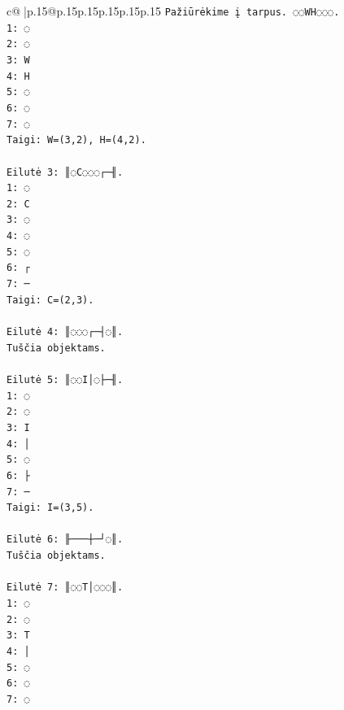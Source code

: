 \documentclass{article}
\begin{document}
{\begin{supertabular}{c@{$\;$}|p{.15\linewidth}@{}p{.15\linewidth}p{.15\linewidth}p{.15\linewidth}p{.15\linewidth}p{.15\linewidth}}
{{{\texttt{Pažiūrėkime į tarpus. ◌◌WH◌◌◌.} \\
\texttt{1: ◌} \\
\texttt{2: ◌} \\
\texttt{3: W} \\
\texttt{4: H} \\
\texttt{5: ◌} \\
\texttt{6: ◌} \\
\texttt{7: ◌} \\
\texttt{Taigi: W=(3,2), H=(4,2).} \\
\\ 
\texttt{Eilutė 3: ║◌C◌◌◌┌─╢.} \\
\texttt{1: ◌} \\
\texttt{2: C} \\
\texttt{3: ◌} \\
\texttt{4: ◌} \\
\texttt{5: ◌} \\
\texttt{6: ┌} \\
\texttt{7: ─} \\
\texttt{Taigi: C=(2,3).} \\
\\ 
\texttt{Eilutė 4: ║◌◌◌┌─┤◌║.} \\
\texttt{Tuščia objektams.} \\
\\ 
\texttt{Eilutė 5: ║◌◌I│◌├─╢.} \\
\texttt{1: ◌} \\
\texttt{2: ◌} \\
\texttt{3: I} \\
\texttt{4: │} \\
\texttt{5: ◌} \\
\texttt{6: ├} \\
\texttt{7: ─} \\
\texttt{Taigi: I=(3,5).} \\
\\ 
\texttt{Eilutė 6: ╟───┼─┘◌║.} \\
\texttt{Tuščia objektams.} \\
\\ 
\texttt{Eilutė 7: ║◌◌T│◌◌◌║.} \\
\texttt{1: ◌} \\
\texttt{2: ◌} \\
\texttt{3: T} \\
\texttt{4: │} \\
\texttt{5: ◌} \\
\texttt{6: ◌} \\
\texttt{7: ◌} \\
}}}
\end{supertabular}}
\end{document}
